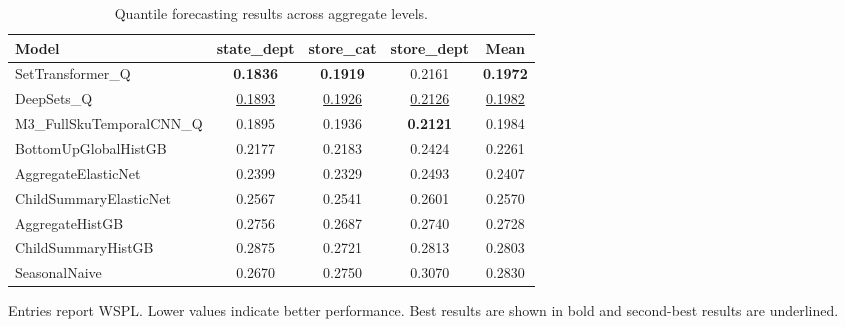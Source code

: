 \begin{table}[H]
\centering
\caption{Quantile forecasting results across aggregate levels.}
\label{tab:main_quantile}
\begin{threeparttable}
\begin{tabular}{lcccc}
\toprule
Model & state\_dept & store\_cat & store\_dept & Mean \\
\midrule
SetTransformer\_Q & \textbf{0.1836} & \textbf{0.1919} & 0.2161 & \textbf{0.1972} \\
DeepSets\_Q & \underline{0.1893} & \underline{0.1926} & \underline{0.2126} & \underline{0.1982} \\
M3\_FullSkuTemporalCNN\_Q & 0.1895 & 0.1936 & \textbf{0.2121} & 0.1984 \\
BottomUpGlobalHistGB & 0.2177 & 0.2183 & 0.2424 & 0.2261 \\
AggregateElasticNet & 0.2399 & 0.2329 & 0.2493 & 0.2407 \\
ChildSummaryElasticNet & 0.2567 & 0.2541 & 0.2601 & 0.2570 \\
AggregateHistGB & 0.2756 & 0.2687 & 0.2740 & 0.2728 \\
ChildSummaryHistGB & 0.2875 & 0.2721 & 0.2813 & 0.2803 \\
SeasonalNaive & 0.2670 & 0.2750 & 0.3070 & 0.2830 \\
\bottomrule
\end{tabular}
\begin{tablenotes}
\footnotesize \item Entries report WSPL. Lower values indicate better performance. Best results are shown in bold and second-best results are underlined.
\end{tablenotes}
\end{threeparttable}
\end{table}
